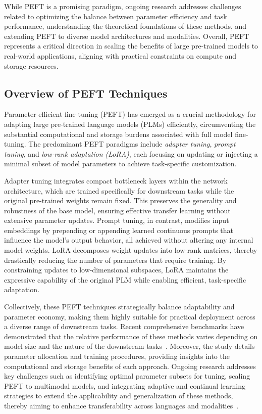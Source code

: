\documentclass[sigconf]{acmart}
\begin{document}
While PEFT is a promising paradigm, ongoing research addresses challenges related to optimizing the balance between parameter efficiency and task performance, understanding the theoretical foundations of these methods, and extending PEFT to diverse model architectures and modalities. Overall, PEFT represents a critical direction in scaling the benefits of large pre-trained models to real-world applications, aligning with practical constraints on compute and storage resources.

\subsection{Overview of PEFT Techniques}

Parameter-efficient fine-tuning (PEFT) has emerged as a crucial methodology for adapting large pre-trained language models (PLMs) efficiently, circumventing the substantial computational and storage burdens associated with full model fine-tuning. The predominant PEFT paradigms include \textit{adapter tuning}, \textit{prompt tuning}, and \textit{low-rank adaptation (LoRA)}, each focusing on updating or injecting a minimal subset of model parameters to achieve task-specific customization.

Adapter tuning integrates compact bottleneck layers within the network architecture, which are trained specifically for downstream tasks while the original pre-trained weights remain fixed. This preserves the generality and robustness of the base model, ensuring effective transfer learning without extensive parameter updates. Prompt tuning, in contrast, modifies input embeddings by prepending or appending learned continuous prompts that influence the model’s output behavior, all achieved without altering any internal model weights. LoRA decomposes weight updates into low-rank matrices, thereby drastically reducing the number of parameters that require training. By constraining updates to low-dimensional subspaces, LoRA maintains the expressive capability of the original PLM while enabling efficient, task-specific adaptation.

Collectively, these PEFT techniques strategically balance adaptability and parameter economy, making them highly suitable for practical deployment across a diverse range of downstream tasks. Recent comprehensive benchmarks have demonstrated that the relative performance of these methods varies depending on model size and the nature of the downstream tasks~\cite{ref48}. Moreover, the study details parameter allocation and training procedures, providing insights into the computational and storage benefits of each approach. Ongoing research addresses key challenges such as identifying optimal parameter subsets for tuning, scaling PEFT to multimodal models, and integrating adaptive and continual learning strategies to extend the applicability and generalization of these methods, thereby aiming to enhance transferability across languages and modalities~\cite{ref48}.
\end{document}
